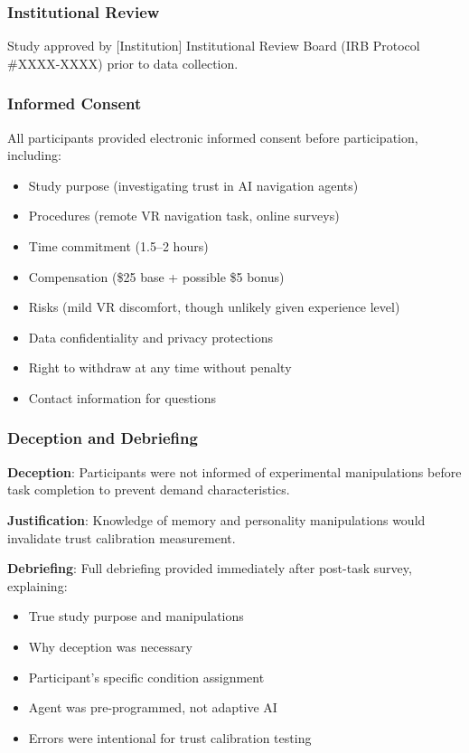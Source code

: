 \documentclass[12pt]{article}
\begin{document}
\subsubsection{Institutional Review}

Study approved by [Institution] Institutional Review Board (IRB Protocol \#XXXX-XXXX) prior to data collection.

\subsubsection{Informed Consent}

All participants provided electronic informed consent before participation, including:
\begin{itemize}
    \item Study purpose (investigating trust in AI navigation agents)
    \item Procedures (remote VR navigation task, online surveys)
    \item Time commitment (1.5--2 hours)
    \item Compensation (\$25 base + possible \$5 bonus)
    \item Risks (mild VR discomfort, though unlikely given experience level)
    \item Data confidentiality and privacy protections
    \item Right to withdraw at any time without penalty
    \item Contact information for questions
\end{itemize}

\subsubsection{Deception and Debriefing}

\textbf{Deception}: Participants were not informed of experimental manipulations before task completion to prevent demand characteristics.

\textbf{Justification}: Knowledge of memory and personality manipulations would invalidate trust calibration measurement.

\textbf{Debriefing}: Full debriefing provided immediately after post-task survey, explaining:
\begin{itemize}
    \item True study purpose and manipulations
    \item Why deception was necessary
    \item Participant's specific condition assignment
    \item Agent was pre-programmed, not adaptive AI
    \item Errors were intentional for trust calibration testing
\end{itemize}
\end{document}
